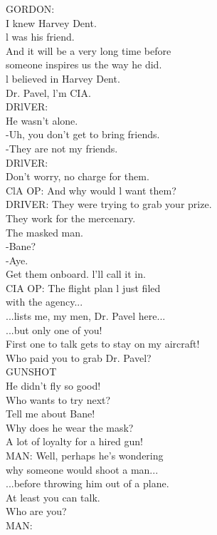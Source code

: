 \documentclass{article}
\date{}
\begin{document}
\columnseprule=0.2pt
\begin{multicols}{3}
\noindent
GORDON:\\
I knew Harvey Dent.\\
l was his friend.\\
And it will be a very long time before\\
someone inspires us the way he did.\\
l believed in Harvey Dent.\\
Dr. Pavel, l'm CIA.\\
DRlVER:\\
He wasn't alone.\\
-Uh, you don't get to bring friends.\\
-They are not my friends.\\
DRlVER:\\
Don't worry, no charge for them.\\
ClA OP: And why would l want them?\\
DRIVER: They were trying to grab your prize.\\
They work for the mercenary.\\
The masked man.\\
-Bane?\\
-Aye.\\
Get them onboard. l'll call it in.\\
CIA OP: The flight plan l just filed\\
with the agency...\\
...lists me, my men, Dr. Pavel here...\\
...but only one of you!\\
First one to talk gets to stay on my aircraft!\\
Who paid you to grab Dr. Pavel?\\
GUNSHOT\\
He didn't fly so good!\\
Who wants to try next?\\
Tell me about Bane!\\
Why does he wear the mask?\\
A lot of loyalty for a hired gun!\\
MAN: Well, perhaps he's wondering\\
why someone would shoot a man...\\
...before throwing him out of a plane.\\
At least you can talk.\\
Who are you?\\
MAN:\\

\end{multicols}
\end{document}
